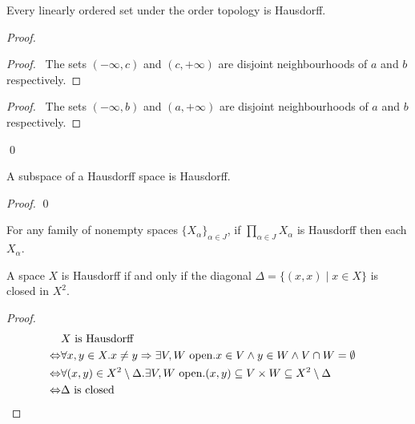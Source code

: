 \begin{theorem}
    Every linearly ordered set under the order topology is Hausdorff.
\end{theorem}

\begin{proof}
    \pf
    \begin{proof}
        \pf\ The sets $(-\infty,c)$ and $(c,+\infty)$ are disjoint neighbourhoods of $a$ and $b$
        respectively.
    \end{proof}
    \begin{proof}
        \pf\ The sets $(-\infty, b)$ and $(a,+\infty)$ are disjoint neighbourhoods of $a$ and $b$
        respectively.
    \end{proof}
    \qed
\end{proof}

\begin{theorem}
    \label{theorem:subspace_Haudorff}
    A subspace of a Hausdorff space is Hausdorff.
\end{theorem}

\begin{proof}
    \pf
    \qed
\end{proof}

\begin{corollary}
    For any family of nonempty spaces $\{ X_\alpha \}_{\alpha \in J}$, if
    $\prod_{\alpha \in J} X_\alpha$ is Hausdorff then each $X_\alpha$.
\end{corollary}

\begin{proposition}
    A space $X$ is Hausdorff if and only if the diagonal $\Delta = \{ (x,x) \mid x \in X \}$ is closed in $X^2$.
\end{proposition}

\begin{proof}
    \pf
    \begin{align*}
        & X \text{ is Hausdorff} \\
        \Leftrightarrow & \forall x,y \in X. x \neq y \Rightarrow \exists V, W \text{ open}. x \in V \wedge y \in W \wedge V \cap W = \emptyset \\
        \Leftrightarrow & \forall (x,y) \in X^2 \setminus \Delta. \exists V,W \text{ open}. (x,y) \subseteq V \times W \subseteq X^2 \setminus \Delta \\
        \Leftrightarrow & \Delta \text{ is closed} & \qed
    \end{align*}
\end{proof}

